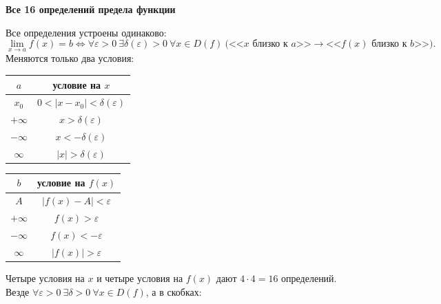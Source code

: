 \documentclass[a4paper,11pt]{article}
\newcommand{\eps}{\varepsilon}
\newcommand{\podr}[1]{\par\needspace{8\baselineskip}\medskip
  {\large\bfseries\textcolor{oprc!80!black}{#1}}\par\nopagebreak\smallskip}
\begin{document}
\podr{Все 16 определений предела функции}

Все определения устроены одинаково:
\[
  \lim_{x \to a} f(x) = b \Leftrightarrow \forall \eps > 0\ \exists \delta(\eps) > 0\
  \forall x \in D(f)\ \bigl( \text{<<$x$ близко к $a$>>} \to \text{<<$f(x)$ близко к $b$>>} \bigr).
\]
Меняются только два условия:
\begin{center}
\renewcommand{\arraystretch}{1.3}
\begin{tabular}{|c|c|}
  \hline
  $a$ & условие на $x$ \\ \hline
  $x_0$ & $0 < |x - x_0| < \delta(\eps)$ \\
  $+\infty$ & $x > \delta(\eps)$ \\
  $-\infty$ & $x < -\delta(\eps)$ \\
  $\infty$ & $|x| > \delta(\eps)$ \\ \hline
\end{tabular}
\qquad
\begin{tabular}{|c|c|}
  \hline
  $b$ & условие на $f(x)$ \\ \hline
  $A$ & $|f(x) - A| < \eps$ \\
  $+\infty$ & $f(x) > \eps$ \\
  $-\infty$ & $f(x) < -\eps$ \\
  $\infty$ & $|f(x)| > \eps$ \\ \hline
\end{tabular}
\end{center}
Четыре условия на $x$ и четыре условия на $f(x)$ дают $4 \cdot 4 = 16$ определений. Везде
$\forall \eps > 0\ \exists \delta > 0\ \forall x \in D(f)$, а в скобках:
\end{document}
